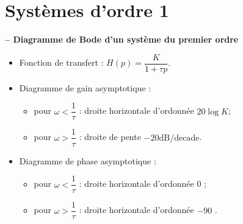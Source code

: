 \section{Systèmes d'ordre 1}
\begin{resultat}\textbf{\textsf{\small -- Diagramme de Bode d'un système du premier ordre}} ~\\

\vspace{-.5cm}

\noindent\begin{minipage}[c]{.53\linewidth}
\begin{itemize}
\item Fonction de transfert : $H(p)=\dfrac{K}{1+\tau p}$.
\item Diagramme de gain asymptotique : 
\begin{itemize}
\item pour $\omega<\dfrac{1}{\tau}$ : droite horizontale d'ordonnée $20 \log K$;
\item pour $\omega>\dfrac{1}{\tau}$ : droite de pente $-{20}\text{dB/decade}$.
\end{itemize}
\item Diagramme de phase asymptotique : 
\begin{itemize}
\item pour $\omega<\dfrac{1}{\tau}$ : droite horizontale d'ordonnée 0 \degre;
\item pour $\omega>\dfrac{1}{\tau}$ : droite horizontale d'ordonnée $-90$ \degre.
\end{itemize}
\end{itemize}
\end{minipage} \hfill
\begin{minipage}[c]{.45\linewidth}


\end{minipage}
\end{resultat}

